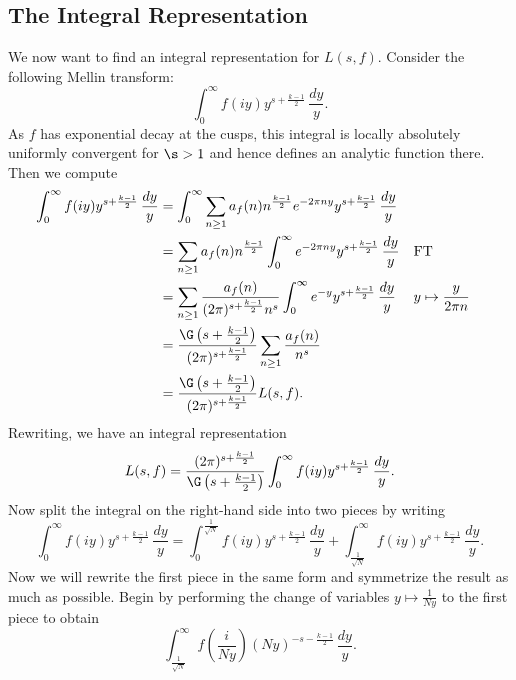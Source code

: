     \subsection*{The Integral Representation}
      We now want to find an integral representation for $L(s,f)$. Consider the following Mellin transform:
      \[
        \int_{0}^{\infty}f(iy)y^{s+\frac{k-1}{2}}\,\frac{dy}{y}.
      \]
      As $f$ has exponential decay at the cusps, this integral is locally absolutely uniformly convergent for $\s > 1$ and hence defines an analytic function there. Then we compute
      \begin{align*}
        \int_{0}^{\infty}f(iy)y^{s+\frac{k-1}{2}}\,\frac{dy}{y} &= \int_{0}^{\infty}\sum_{n \ge 1}a_{f}(n)n^{\frac{k-1}{2}}e^{-2\pi ny}y^{s+\frac{k-1}{2}}\,\frac{dy}{y} \\
        &= \sum_{n \ge 1}a_{f}(n)n^{\frac{k-1}{2}}\int_{0}^{\infty}e^{-2\pi ny}y^{s+\frac{k-1}{2}}\,\frac{dy}{y} &&\text{FT} \\
        &= \sum_{n \ge 1}\frac{a_{f}(n)}{(2\pi)^{s+\frac{k-1}{2}}n^{s}}\int_{0}^{\infty}e^{-y}y^{s+\frac{k-1}{2}}\,\frac{dy}{y} &&\text{$y \mapsto \frac{y}{2\pi n}$} \\
        &= \frac{\G\left(s+\frac{k-1}{2}\right)}{(2\pi)^{s+\frac{k-1}{2}}}\sum_{n \ge 1}\frac{a_{f}(n)}{n^{s}} \\
        &= \frac{\G\left(s+\frac{k-1}{2}\right)}{(2\pi)^{s+\frac{k-1}{2}}}L(s,f).
      \end{align*}
      Rewriting, we have an integral representation
      \begin{equation}\label{equ:integral_representation_holomorphic_1}
        L(s,f) = \frac{(2\pi)^{s+\frac{k-1}{2}}}{\G\left(s+\frac{k-1}{2}\right)}\int_{0}^{\infty}f(iy)y^{s+\frac{k-1}{2}}\,\frac{dy}{y}.
      \end{equation}
      Now split the integral on the right-hand side into two pieces by writing
      \begin{equation}\label{equ:symmetric_integral_holomorphic_split}
        \int_{0}^{\infty}f(iy)y^{s+\frac{k-1}{2}}\,\frac{dy}{y} = \int_{0}^{\frac{1}{\sqrt{N}}}f(iy)y^{s+\frac{k-1}{2}}\,\frac{dy}{y}+\int_{\frac{1}{\sqrt{N}}}^{\infty}f(iy)y^{s+\frac{k-1}{2}}\,\frac{dy}{y}.
      \end{equation}
      Now we will rewrite the first piece in the same form and symmetrize the result as much as possible. Begin by performing the change of variables $y \mapsto \frac{1}{Ny}$ to the first piece to obtain
      \[
        \int_{\frac{1}{\sqrt{N}}}^{\infty}f\left(\frac{i}{Ny}\right)(Ny)^{-s-\frac{k-1}{2}}\,\frac{dy}{y}.
      \]

